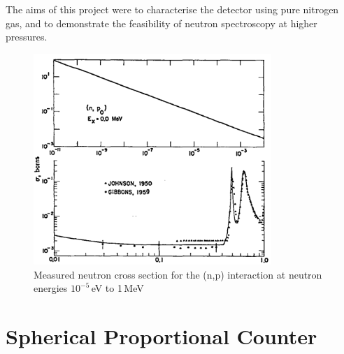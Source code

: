 \documentclass[a4paper]{article}
\begin{document}
\newline The aims of this project were to characterise the detector using pure nitrogen gas, and to demonstrate the feasibility of neutron spectroscopy at higher pressures.
\begin{figure}[H]
    \centering
    \includegraphics[height=8cm]{Crosssection.png}
    \caption{Measured neutron cross section for the (n,p) interaction at neutron energies $10^{-5}$\,eV to 1\,MeV \cite{young_foster_1972}}
    \label{fig:cross}
\end{figure}
\newpage
\section{Spherical Proportional Counter}
\end{document}

